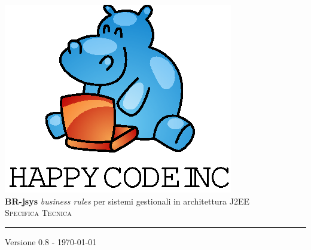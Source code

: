 \documentclass[11pt,titlepage,a4paper]{report}
\begin{document}
\newcommand{\lv}{ 0.8 } %
\newcommand{\dt}{ Specifica Tecnica }%
\newcommand{\Glossario}{ Glossario.1.4.pdf }
\newcommand{\PdQ}{ PianoDiQualifica.1.1.pdf }
\newcommand{\PdP}{ PianoDiProgetto.1.1.pdf }

\newcommand{\br}{business rule}
\newcommand{\brs}{business rules}
\newcommand{\bo}{business object}
\newcommand{\bos}{business objects}
\newcommand{\re}{repository}
\newcommand{\brp}{BusinessRuleParser}
\newcommand{\brl}{BusinessRuleLexer}
\newcommand{\BR}{BusinessRule}



\begin{titlepage}\begin{center}
\vspace*{0.5in}
\includegraphics{logo.eps}
\vspace*{0.2in} \\
{\Large \textbf{BR-jsys}}
{\Large \emph{business rules} per sistemi gestionali in architettura J2EE } 
\vspace{2in} \\
\Huge \textsc{ \dt }
\par\rule{10cm}{0.4pt} \par {\large Versione \lv - \today} \\
\end{center}\end{titlepage}
\vspace*{0.5in}
\end{document}
